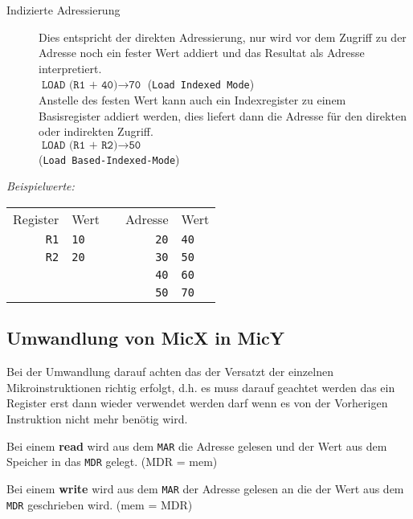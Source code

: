 \documentclass
[
	8pt,		%
	ngerman,	%
	a4paper,	%
	landscape,	%
	final		%
]{extarticle}
\begin{document}
\begin{multicols*}{4}
\begin{description}
	\item[Indizierte Adressierung]
	      Dies entspricht der direkten Adressierung, nur wird vor dem
	      Zugriff zu der Adresse noch ein fester Wert addiert und das
	      Resultat als Adresse interpretiert. \\
	      $\texttt{LOAD (R1 + 40)}\rightarrow\texttt{70}$ (\texttt{Load Indexed Mode}) \\
	      Anstelle des festen Wert kann auch ein Indexregister zu einem
	      Basisregister addiert werden, dies liefert dann die Adresse für
	      den direkten oder indirekten Zugriff. \\
	      $\texttt{LOAD (R1 + R2)}\rightarrow\texttt{50}$ \\(\texttt{Load Based-Indexed-Mode})
\end{description}
\emph{Beispielwerte:}
\begin{center}
	\begin{tabular}{|r|l|c|r|l|}\cline{1-2}\cline{4-5}
		Register    & Wert        &  & Adresse     & Wert        \\\cline{1-2}\cline{4-5}
		\texttt{R1} & \texttt{10} &  & \texttt{20} & \texttt{40} \\\cline{1-2}\cline{4-5}
		\texttt{R2} & \texttt{20} &  & \texttt{30} & \texttt{50} \\\cline{1-2}\cline{4-5}
		            &             &  & \texttt{40} & \texttt{60} \\\cline{1-2}\cline{4-5}
		            &             &  & \texttt{50} & \texttt{70} \\\cline{1-2}\cline{4-5}
	\end{tabular}
\end{center}
\subsection{Umwandlung von MicX in MicY}
Bei der Umwandlung darauf achten das der Versatzt der einzelnen Mikroinstruktionen
richtig erfolgt, d.h. es muss darauf geachtet werden das ein Register erst dann wieder
verwendet werden darf wenn es von der Vorherigen Instruktion nicht mehr benötig wird. \par
Bei einem \textbf{read} wird aus dem \texttt{MAR} die Adresse gelesen und der Wert aus
dem Speicher in das \texttt{MDR} gelegt. (\textsf{MDR = mem}) \par
Bei einem \textbf{write} wird aus dem \texttt{MAR} der Adresse gelesen an die der Wert
aus dem \texttt{MDR} geschrieben wird. (\textsf{mem = MDR})

\end{multicols*}
\end{document}
